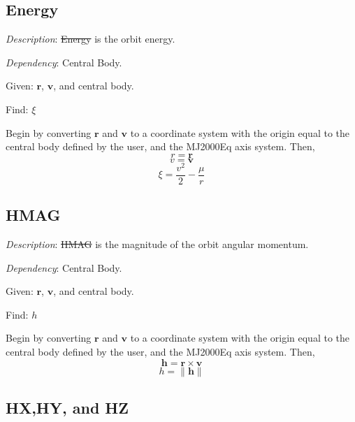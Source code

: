 \subsection{Energy}

\noindent \textit{Description}: \st{Energy} is the orbit energy.

\noindent \textit{Dependency}:  Central Body.

\noindent Given:  $\mathbf{r}$, $\mathbf{v}$, and central body.

\noindent Find:  $\xi$

Begin by converting $\mathbf{r}$ and $\mathbf{v}$ to a coordinate
system with the origin equal to the central body defined by the
user, and the MJ2000Eq axis system.  Then,
%
\begin{equation}
     r = \mathbf{r}
\end{equation}
%
\begin{equation}
     v = \mathbf{v}
\end{equation}
%
\begin{equation}
    \xi = \frac{v^2}{2} - \frac{\mu}{r}
\end{equation}


\subsection{HMAG} 

\noindent \textit{Description}: \st{HMAG} is the magnitude of the
orbit angular momentum.

\noindent \textit{Dependency}:  Central Body.

\noindent Given:  $\mathbf{r}$, $\mathbf{v}$, and central body.

\noindent Find:  $h$

Begin by converting $\mathbf{r}$ and $\mathbf{v}$ to a coordinate
system with the origin equal to the central body defined by the
user, and the MJ2000Eq axis system.  Then,
%
\begin{equation}
    \mathbf{h} = \mathbf{r} \times \mathbf{v}
\end{equation}
%
\begin{equation}
    h = \| \mathbf{h} \|
\end{equation}

\subsection{HX,HY, and HZ}   

